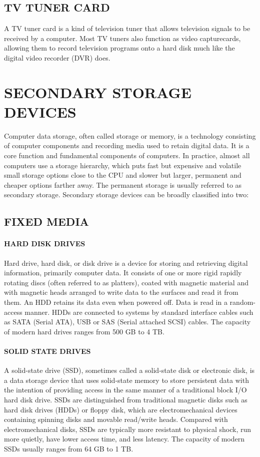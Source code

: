 	\subsection{ TV TUNER CARD}
	 A TV tuner card is a kind of television tuner that allows television signals to be received by
	a computer. Most TV tuners also function as video capturecards, allowing them to record television
	programs onto a hard disk much like the digital video recorder (DVR) does.
	\section {SECONDARY STORAGE DEVICES}
	Computer data storage, often called storage or memory, is a technology consisting of computer components
	and recording media used to retain digital data. It is a core function and fundamental components of
	computers. In practice, almost all computers use a storage hierarchy, which puts fast but expensive and volatile
	small storage options close to the CPU and slower but larger, permanent and cheaper options farther away. The
	permanent storage is usually referred to as secondary storage. Secondary storage devices can be broadly
	classified into two:
	\subsection {FIXED MEDIA}
	\paragraph{ HARD DISK DRIVES}
	  Hard drive, hard disk, or disk drive is a device for
	storing and retrieving digital information, primarily computer data. It consists of one or more rigid rapidly rotating discs (often referred to as platters), coated with magnetic material and
	with magnetic heads arranged to write data to the surfaces and read it from them. An HDD retains its
	data even when powered off. Data is read in a random-access manner. HDDs are
	connected to systems by standard interface cables such as SATA (Serial ATA), USB or SAS (Serial
	attached SCSI) cables. The capacity of modern hard drives ranges from 500 GB to 4 TB.
	\paragraph{ SOLID STATE DRIVES}
	A solid-state drive (SSD), sometimes called a solid-state disk or electronic disk, is a
	data storage device that uses solid-state memory to store persistent data with the intention of providing
	access in the same manner of a traditional block I/O hard disk drive. SSDs are distinguished from
	traditional magnetic disks such as hard disk drives (HDDs) or floppy disk, which are electromechanical
	devices containing spinning disks and movable read/write heads. Compared with electromechanical
	disks, SSDs are typically more resistant to physical shock, run more quietly, have lower access time,
	and less latency. The capacity of modern
	SSDs usually ranges from 64 GB to 1 TB.
